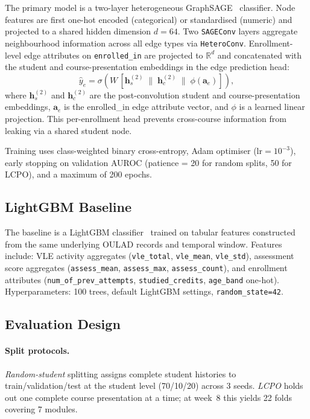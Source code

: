\documentclass[sigconf,review]{acmart}
\begin{document}
The primary model is a two-layer heterogeneous
GraphSAGE~\cite{hamilton2017sage} classifier.  Node features are first
one-hot encoded (categorical) or standardised (numeric) and projected to a
shared hidden dimension $d = 64$.  Two \texttt{SAGEConv} layers aggregate
neighbourhood information across all edge types via \texttt{HeteroConv}.
Enrollment-level edge attributes on \texttt{enrolled\_in} are projected to
$\mathbb{R}^d$ and concatenated with the student and course-presentation
embeddings in the edge prediction head:
\begin{equation}
  \hat{y}_e = \sigma\!\left(W\,[\mathbf{h}^{(2)}_s \;\|\; \mathbf{h}^{(2)}_c \;\|\; \phi(\mathbf{a}_e)]\right),
  \label{eq:edgehead}
\end{equation}
where $\mathbf{h}^{(2)}_s$ and $\mathbf{h}^{(2)}_c$ are the post-convolution
student and course-presentation embeddings, $\mathbf{a}_e$ is the
enrolled\_in edge attribute vector, and $\phi$ is a learned linear
projection.  This per-enrollment head prevents cross-course information from
leaking via a shared student node.

Training uses class-weighted binary cross-entropy, Adam optimiser
($\text{lr} = 10^{-3}$), early stopping on validation AUROC
(patience = 20 for random splits, 50 for LCPO), and a maximum of 200 epochs.

\subsection{LightGBM Baseline}
\label{sec:lgbm}

The baseline is a LightGBM classifier~\cite{ke2017lightgbm} trained on
tabular features constructed from the same underlying OULAD records and
temporal window.  Features include: VLE activity aggregates
(\texttt{vle\_total}, \texttt{vle\_mean}, \texttt{vle\_std}), assessment
score aggregates (\texttt{assess\_mean}, \texttt{assess\_max},
\texttt{assess\_count}), and enrollment attributes
(\texttt{num\_of\_prev\_attempts}, \texttt{studied\_credits},
\texttt{age\_band} one-hot).  Hyperparameters: 100 trees, default
LightGBM settings, \texttt{random\_state=42}.

\subsection{Evaluation Design}
\label{sec:eval}

\paragraph{Split protocols.}
\emph{Random-student} splitting assigns complete student histories to
train/validation/test at the student level (70/10/20) across 3 seeds.
\emph{LCPO} holds out one complete course presentation at a time; at week~8
this yields 22 folds covering 7 modules.
\end{document}
